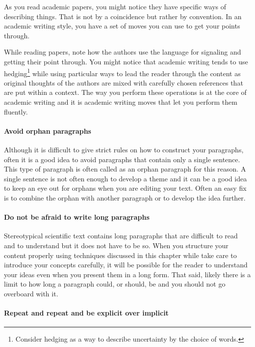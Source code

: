 As you read academic papers, you might notice they have specific ways of describing things.
That is not by a coincidence but rather by convention.
In an academic writing style, you have a set of moves \citep{aull2020students} you can use to get your points through.

While reading papers, note how the authors use the language for signaling and getting their point through.
You might notice that academic writing tends to use hedging\footnote{Consider hedging as a way to describe uncertainty by the choice of words.} while using particular ways to lead the reader through the content as original thoughts of the authors are mixed with carefully chosen references that are put within a context.
The way you perform these operations is at the core of academic writing and it is academic writing moves that let you perform them fluently.

\paragraph{Avoid orphan paragraphs}

Although it is difficult to give strict rules on how to construct your paragraphs, often it is a good idea to avoid paragraphs that contain only a single sentence.
This type of paragraph is often called as an orphan paragraph for this reason.
A single sentence is not often enough to develop a theme and it can be a good idea to keep an eye out for orphans when you are editing your text.
Often an easy fix is to combine the orphan with another paragraph or to develop the idea further.

\paragraph{Do not be afraid to write long paragraphs}

Stereotypical scientific text contains long paragraphs that are difficult to read and to understand but it does not have to be so.
When you structure your content properly using techniques discussed in this chapter while take care to introduce your concepts carefully, it will be possible for the reader to understand your ideas even when you present them in a long form.
That said, likely there is a limit to how long a paragraph could, or should, be and you should not go overboard with it.

\paragraph{Repeat and repeat and be explicit over implicit}

